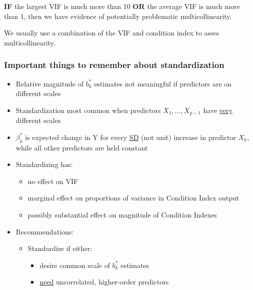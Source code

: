 \documentclass[12pt]{../notes}
\begin{document}
\begin{center}
\textbf{IF} the largest VIF is much more than 10 \textbf{OR} the average VIF is much more than 1, then we have evidence of potentially problematic multicollinearity. 
\end{center}

We usually use a combination of the VIF and condition index to asses multicollinearity.

\subsubsection{Important things to remember about standardization}
    \begin{itemize}
        \item Relative magnitude of $b^*_k$ estimates not meaningful if predictors are on different scales
        \item Standardization most common when predictors $X_1, \ldots, X_{p-1}$ have \underline{very} different scales
        \item $\beta^*_k$ is expected change in Y for every \underline{SD} (not unit) increase in predictor $X_k$,
while all other predictors are held constant
  \item Standardizing has:
      \begin{itemize}
          \item no effect on VIF
          \item marginal effect on proportions of variance in Condition Index output
          \item possibly substantial effect on magnitude of Condition Indexes
      \end{itemize}
  \item Recommendations:
     \begin{itemize}
        \item Standardize if either:
          \begin{itemize}
            \item desire common scale of $b^*_k$ estimates\\ \vspace{1em} %
            \item \underline{need} uncorrelated, higher-order predictors\\ \vspace{1em} %
          \end{itemize}
     \end{itemize}
     \end{itemize}
\end{document}
